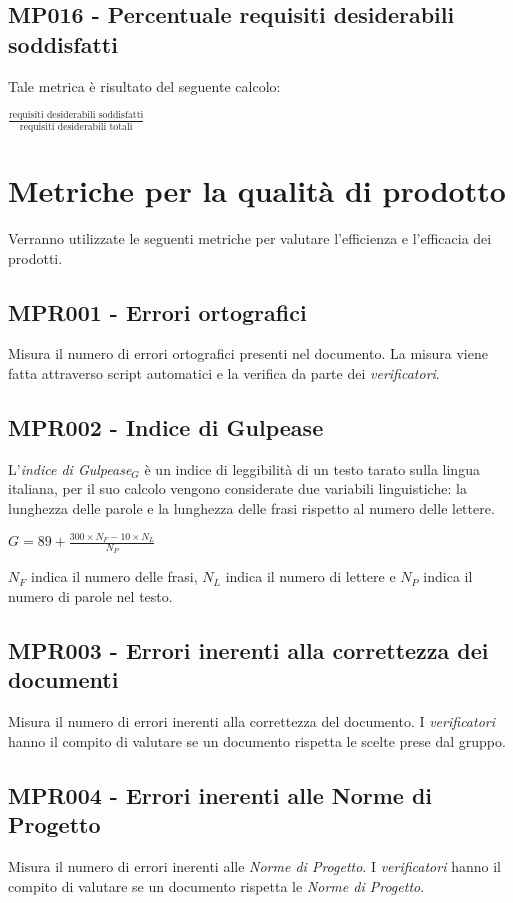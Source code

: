 \subsection{MP016 - Percentuale requisiti desiderabili soddisfatti}
Tale metrica è risultato del seguente calcolo:
\begin{center}
$\frac{\mbox{requisiti desiderabili soddisfatti}}{\mbox{requisiti desiderabili totali}}$
\end{center}

\section{Metriche per la qualità di prodotto}\label{metriche}
Verranno utilizzate le seguenti metriche per valutare l'efficienza e l'efficacia dei
prodotti.
\subsection{MPR001 - Errori ortografici}
Misura il numero di errori ortografici presenti nel documento. La misura viene fatta attraverso script automatici e la verifica da parte dei \textit{verificatori}.

\subsection{MPR002 - Indice di Gulpease}
L’\textit{indice di Gulpease$_{G}$} è un indice di leggibilità di un testo tarato sulla lingua italiana, per il suo calcolo vengono considerate due variabili linguistiche: la lunghezza delle parole e la lunghezza delle frasi rispetto al numero delle lettere.
\begin{center}{$G=89+\frac{300\times N_F-10\times N_L}{N_P}$}\end{center}
$N_F$ indica il numero delle frasi, $N_L$ indica il numero di lettere e $N_P$ indica il numero di parole nel testo.

\subsection{MPR003 - Errori inerenti alla correttezza dei documenti}
Misura il numero di errori inerenti alla correttezza del documento. I \textit{verificatori} hanno il compito di valutare se un documento rispetta le scelte prese dal gruppo.

\subsection{MPR004 - Errori inerenti alle Norme di Progetto}
Misura il numero di errori inerenti alle \textit{Norme di Progetto}. I \textit{verificatori} hanno il compito di valutare se un documento rispetta le \textit{Norme di Progetto}.


